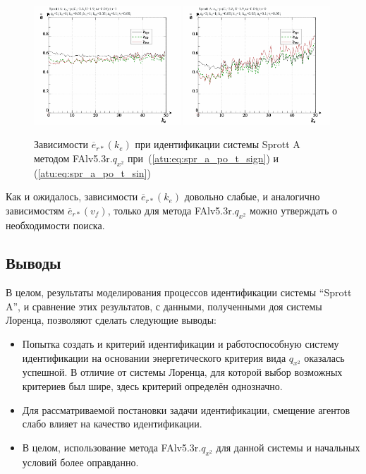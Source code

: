 \begin{figure}[h!]
  \centerline{
    \includegraphics[width=0.49\textwidth]{p/cha/spr_a/FAlv5.3A/sprott_a_FAlv5x3r-p_ke_e_sign.png}
    \hfill
    \includegraphics[width=0.49\textwidth]{p/cha/spr_a/FAlv5.3A/sprott_a_FAlv5x3r-p_ke_e_sin.png}
  }
  \caption{Зависимости $\overline{e}_{r*}(k_e)$ при идентификации системы Sprott A методом FAlv5.3r.$q_{x^2}$
   при~(\ref{atu:eq:spr_a_po_t_sign}) и (\ref{atu:eq:spr_a_po_t_sin})}
  \label{atu:f:spr_a_k_e_FAlv5.3r.q_x2}
\end{figure}

Как и ожидалось, зависимости $\overline{e}_{r*}(k_e)$
довольно слабые, и аналогично зависимостям  $\overline{e}_{r*}(v_f)$,
только для метода FAlv5.3r.$q_{x^2}$ можно
утверждать о необходимости поиска.



\subsection{Выводы}  %

В целом, результаты моделирования процессов идентификации системы ``Sprott A'',
и сравнение этих результатов, с данными, полученными
доя системы Лоренца, позволяют сделать следующие выводы:

\begin{itemize}

  \item
    Попытка создать и критерий идентификации и работоспособную систему идентификации
    на основании энергетического критерия вида $q_{x^2}$ оказалась успешной. В отличие
    от системы Лоренца, для которой выбор возможных критериев был шире,
    здесь критерий определён однозначно.

  \item
    Для рассматриваемой постановки задачи идентификации,
    смещение агентов слабо влияет на качество идентификации.

  \item
    В целом, использование метода  FAlv5.3r.$q_{x^2}$ для данной системы
    и начальных условий более оправданно.

\end{itemize}




